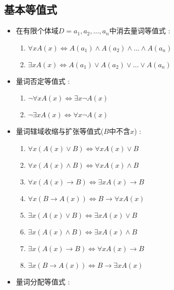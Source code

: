 {{  \subsection{基本等值式}{
    \begin{itemize}
      \item {
            在有限个体域$D = {a_1,a_2,\dots,a_n}$中消去量词等值式 :

            \begin{enumerate}
              \item $\forall x A(x) \Leftrightarrow A(a_1) \land A(a_2) \land \dots \land A(a_n)$
              \item $\exists x A(x) \Leftrightarrow A(a_1) \lor A(a_2) \lor \dots \lor A(a_n)$
            \end{enumerate}
            }
      \item {
            量词否定等值式 :

            \begin{enumerate}
              \item $\lnot\forall x A(x) \Leftrightarrow \exists x \lnot A(x)$
              \item $\lnot\exists x A(x) \Leftrightarrow \forall x \lnot A(x)$
            \end{enumerate}
            }
      \item {
            量词辖域收缩与扩张等值式($B$中不含$x$) :

            \begin{enumerate}
              \item $\forall x (A(x) \lor B) \Leftrightarrow \forall x A(x) \lor B$
              \item $\forall x (A(x) \land B) \Leftrightarrow \forall x A(x) \land B$
              \item $\forall x (A(x) \to B) \Leftrightarrow \exists x A(x) \to B$
              \item $\forall x (B \to A(x)) \Leftrightarrow B \to \forall x A(x)$
              \item $\exists x (A(x) \lor B) \Leftrightarrow \exists x A(x) \lor B$
              \item $\exists x (A(x) \land B) \Leftrightarrow \exists x A(x) \land B$
              \item $\exists x (A(x) \to B) \Leftrightarrow \forall x A(x) \to B$
              \item $\exists x (B \to A(x)) \Leftrightarrow B \to \exists x A(x)$
            \end{enumerate}
            }
      \item {
            量词分配等值式 :

}
\end{itemize}}}}
